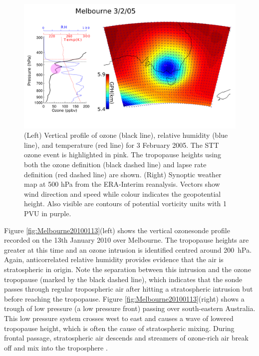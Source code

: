 \documentclass{article}
\begin{document}
  \begin{figure}[!htbp]
    \begin{center}
    \includegraphics[width=1.0\columnwidth]{figures/Melbourne20050203.png}
    \caption{(Left) Vertical profile of ozone (black line), relative humidity (blue line), and temperature (red line) for  3 February 2005.
    The STT ozone event is highlighted in pink.
    The tropopause heights using both the ozone definition (black dashed line) and lapse rate definition (red dashed line) are shown.
    (Right) Synoptic weather map at 500 hPa from the ERA-Interim reanalysis.
    Vectors show wind direction and speed while colour indicates the geopotential height.
    Also visible are contours of potential vorticity units with 1 PVU in purple.}
    \label{fig:Melbourne20050203}
    \end{center}
  \end{figure}
  
  Figure \ref{fig:Melbourne20100113}(left) shows the vertical ozonesonde profile recorded on the 13th January 2010 over Melbourne.
  The tropopause heights are greater at this time and an ozone intrusion is identified centred around 200~hPa.
  Again, anticorrelated relative humidity provides evidence that the air is stratospheric in origin.
  Note the separation between this intrusion and the ozone tropopause (marked by the black dashed line), which indicates that the sonde passes through regular tropospheric air after hitting a stratospheric intrusion but before reaching the tropopause.
  Figure \ref{fig:Melbourne20100113}(right) shows a trough of low pressure (a low pressure front) passing over south-eastern Australia.
  This low pressure system crosses west to east and causes a wave of lowered tropopause height, which is often the cause of stratospheric mixing.
  During frontal passage, stratospheric air descends and streamers of ozone-rich air break off and mix into the troposphere \citep{Sprenger2003}.
  
\end{document}
